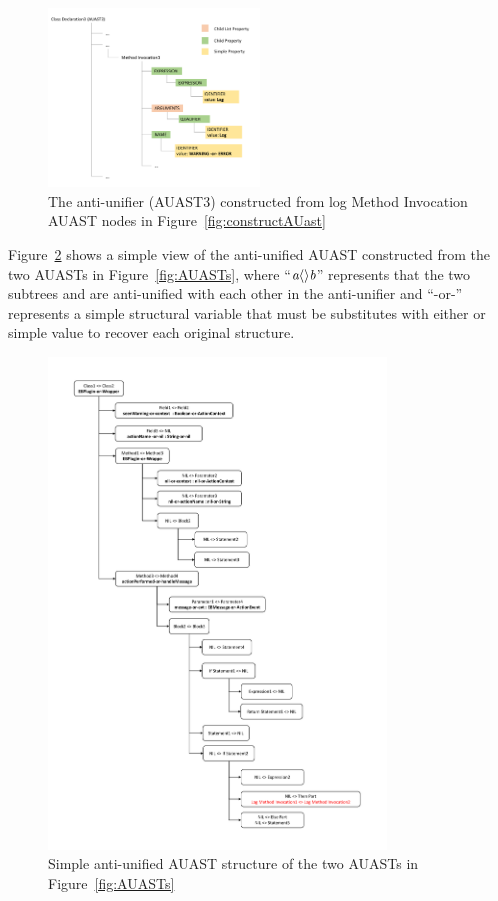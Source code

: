 \begin{figure} [H]
  \centering\includegraphics [width = 0.5\textwidth, height = 0.35\textheight]
  {Drawing4/structureAU.pdf}
  \caption{The anti-unifier (AUAST3) constructed from log Method Invocation AUAST nodes in Figure~\ref{fig:constructAUast} }
  \label{fig:AUAUAST}
\end{figure}

Figure~\ref{fig:meth-anti-unifier} shows a simple view of the anti-unified AUAST constructed from the two AUASTs in Figure~\ref{fig:AUASTs}, where ``$\textit{a}\langle\rangle\textit{b}$'' represents that the two subtrees  and  are anti-unified with each other in the anti-unifier and ``-or-'' represents a simple structural variable that must be substitutes with either  or  simple value to recover each original structure.


\begin{figure} [H]
  \centering\includegraphics [width = 0.8\textwidth, height = 0.9\textheight]{Drawing4/Anti-unifier.pdf}
  \caption{Simple anti-unified AUAST structure of the two  AUASTs in Figure~\ref{fig:AUASTs}}
  \label{fig:meth-anti-unifier}
\end{figure}
